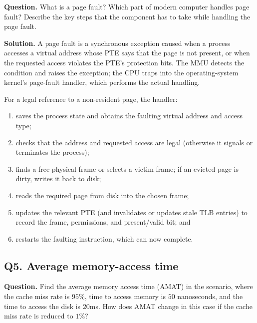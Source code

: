 \textbf{Question.}
What is a page fault? Which part of modern computer handles page fault?
Describe the key steps that the component has to take while handling the page
fault.

\textbf{Solution.}
A page fault is a synchronous exception caused when a process accesses a
virtual address whose PTE says that the page is not present, or when the
requested access violates the PTE's protection bits. The MMU detects the
condition and raises the exception; the CPU traps into the operating-system
kernel's page-fault handler, which performs the actual handling.

For a legal reference to a non-resident page, the handler:
\begin{enumerate}
\item saves the process state and obtains the faulting virtual address and
access type;
\item checks that the address and requested access are legal (otherwise it
signals or terminates the process);
\item finds a free physical frame or selects a victim frame; if an evicted
page is dirty, writes it back to disk;
\item reads the required page from disk into the chosen frame;
\item updates the relevant PTE (and invalidates or updates stale TLB entries)
to record the frame, permissions, and present/valid bit; and
\item restarts the faulting instruction, which can now complete.
\end{enumerate}

\subsection*{Q5. Average memory-access time}

\textbf{Question.}
Find the average memory access time (AMAT) in the scenario, where the cache
miss rate is \(95\%\), time to access memory is \(50\) nanoseconds, and the
time to access the disk is \(20\)ms. How does AMAT change in this case if the
cache miss rate is reduced to \(1\%\)?

